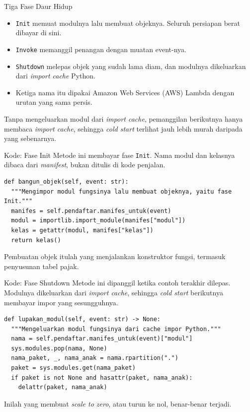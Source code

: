 \documentclass[aspectratio=169, table, 12pt]{beamer}
\begin{document}
\begin{frame}{{\Large Tiga Fase Daur Hidup}}
  \vspace{10pt}
  \begin{itemize}\small
    \item \texttt{Init} memuat modulnya lalu membuat objeknya. Seluruh
          persiapan berat dibayar di sini.
    \item \texttt{Invoke} memanggil penangan dengan muatan event-nya.
    \item \texttt{Shutdown} melepas objek yang sudah lama diam, dan modulnya
          dikeluarkan dari \textit{import cache} Python.
    \item Ketiga nama itu dipakai Amazon Web Services (AWS) Lambda dengan
          urutan yang sama persis.
  \end{itemize}

  \vspace{8pt}
  {\small Tanpa mengeluarkan modul dari \textit{import cache}, pemanggilan
  berikutnya hanya membaca \textit{import cache}, sehingga \textit{cold start}
  terlihat jauh lebih murah daripada yang sebenarnya.}
\end{frame}

\begin{frame}[fragile]{{\Large Kode: Fase Init}}
  \vspace{10pt}
  {\small Metode ini membayar fase \texttt{Init}. Nama modul dan kelasnya
  dibaca dari \textit{manifest}, bukan ditulis di kode penjalan.}
  \vspace{2pt}
\begin{lstlisting}[style=PythonStyle]
def bangun_objek(self, event: str):
  """Mengimpor modul fungsinya lalu membuat objeknya, yaitu fase Init."""
  manifes = self.pendaftar.manifes_untuk(event)
  modul = importlib.import_module(manifes["modul"])
  kelas = getattr(modul, manifes["kelas"])
  return kelas()
\end{lstlisting}
  \vspace{2pt}
  {\small Pembuatan objek itulah yang menjalankan konstruktor fungsi, termasuk
  penyusunan tabel pajak.}
\end{frame}

\begin{frame}[fragile]{{\Large Kode: Fase Shutdown}}
  \vspace{10pt}
  {\small Metode ini dipanggil ketika contoh terakhir dilepas. Modulnya
  dikeluarkan dari \textit{import cache}, sehingga \textit{cold start}
  berikutnya membayar impor yang sesungguhnya.}
  \vspace{2pt}
\begin{lstlisting}[style=PythonStyle]
def lupakan_modul(self, event: str) -> None:
  """Mengeluarkan modul fungsinya dari cache impor Python."""
  nama = self.pendaftar.manifes_untuk(event)["modul"]
  sys.modules.pop(nama, None)
  nama_paket, _, nama_anak = nama.rpartition(".")
  paket = sys.modules.get(nama_paket)
  if paket is not None and hasattr(paket, nama_anak):
    delattr(paket, nama_anak)
\end{lstlisting}
  \vspace{2pt}
  {\small Inilah yang membuat \textit{scale to zero}, atau turun ke nol,
  benar-benar terjadi.}
\end{frame}
\end{document}
